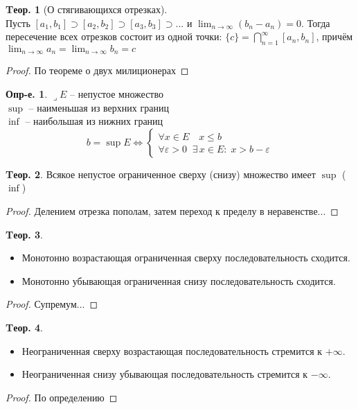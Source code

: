 \documentclass[a4paper,12pt]{article}
\numberwithin{figure}{section}
\theoremstyle{definition}
\newtheorem{definition}{Опр-е.}[section]
\theoremstyle{definition}
\newtheorem{theorem}{Tеор.}[section]
\def\DS{\displaystyle}
\def\.{\;\;}
\def\eps{\varepsilon}
\def\ntoinf{n\to\infty}
\def\leqs{\leqslant}
\def\lets{{\huge$\lrcorner$}\space}
\begin{document}
\begin{theorem}[О стягивающихся отрезках] \ \\
	Пусть $[a_1,b_1] \supset [a_2,b_2] \supset [a_3,b_3] \supset ...$
	и $\DS \lim_{\ntoinf}(b_n-a_n) = 0$.
	Тогда пересечение всех отрезков состоит из одной точки:
	$\DS \{c\} = \bigcap_{n=1}^{\infty} [a_n,b_n]$, причём
	$\DS \lim_{\ntoinf}a_n = \lim_{\ntoinf}b_n = c$
\end{theorem}
\begin{proof} По теореме о двух милиционерах \end{proof}
\bigskip

\begin{definition}
	\lets $E$ -- непустое множество \\
	$\sup$ -- наименьшая из верхних границ \\
	$\inf$ -- наибольшая из нижних границ
	\[ b = \sup E \Longleftrightarrow
		\begin{cases*}
			\forall x \in E \quad x \leqs b \\
			\forall \eps > 0 \. \exists\, x \in E : \;  x > b - \eps
		\end{cases*}
	\]
\end{definition}
\bigskip

\begin{theorem}
	Всякое непустое ограниченное сверху (снизу) множество имеет $\sup$ ($\inf$)
\end{theorem}
\begin{proof} Делением отрезка пополам, затем переход к пределу в неравенстве... \end{proof}
\bigskip

\begin{theorem}  \ \\
	\begin{itemize}
		\item Монотонно возрастающая ограниченная сверху последовательность сходится.
		\item Монотонно убывающая ограниченная снизу последовательность сходится.
	\end{itemize}
\end{theorem}
\begin{proof} Супремум... \end{proof}
\bigskip

\begin{theorem}  \ \\
	\begin{itemize}
		\item Неограниченная сверху возрастающая последовательность стремится к $+\infty$.
		\item Неограниченная снизу убывающая последовательность стремится к $-\infty$.
	\end{itemize}
\end{theorem}
\begin{proof} По определению \end{proof}
\bigskip
\end{document}
